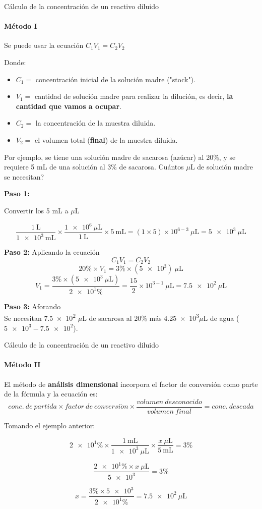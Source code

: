 \documentclass[12pt, aspectratio=169]{beamer}
\begin{document}
\begin{frame} {C\'alculo de la concentraci\'on de un reactivo diluido} %
	\framesubtitle{M\'etodo I}
	Se puede usar la ecuaci\'on $C_1V_1 = C_2V_2$
	
	Donde:
	\begin{itemize}
		\item $C_1 =$ concentraci\'on inicial de la soluci\'on madre ("stock").
		\item $V_1 =$ cantidad de soluci\'on madre para realizar la diluci\'on, es decir, \textbf{la cantidad que vamos a ocupar}.
		\item $C_2 =$ la concentraci\'on de la muestra diluida.
		\item $V_2 =$ el volumen total (\textbf{final}) de la muestra diluida.  
	\end{itemize}
	
	Por ejemplo, se tiene una soluci\'on madre de sacarosa (az\'ucar) al 20\%, y se requiere 5 mL de una soluci\'on al 3\% de sacarosa. \textquestiondown Cu\'antos $\mu$L de soluci\'on madre se necesitan?
	
	\textbf{Paso 1:}
	
	Convertir los 5 mL a $\mu$L
	
	$$\frac{1~ \text{L}}{\num{1e3} ~\text{mL}} \times \frac{\num{1e6}~\mu \text{L}}{1~ \text{L}} \times 5 ~\text{mL} = (1 \times 5) \times 10^{6-3} ~\mu \text{L} = \num{5e3} ~\mu \text{L} $$ 
	
	\textbf{Paso 2:}
	Aplicando la ecuaci\'on
	$$C_1V_1 = C_2V_2$$
	$$20\% \times V_1 = 3\% \times (\num{5e3})~\mu \text{L}$$	
	$$V_1 = \frac{3\% \times (\num{5e3}~\mu \text{L})}{\num{2e1}\%} = \frac{15}{2} \times 10^{3-1} ~\mu \text{L} = \num{7.5e2} ~\mu \text{L}$$
	
	\textbf{Paso 3:} 
	Aforando \\
	Se necesitan \num{7.5e2} $\mu \text{L}$ de sacarosa al 20\% m\'as \num{4.25e3}$\mu \text{L}$ de agua ($\num{5e3}-\num{7.5e2}$). 
		
\end{frame}

\begin{frame} {C\'alculo de la concentraci\'on de un reactivo diluido}
	\framesubtitle{M\'etodo II}
	El m\'etodo de \textbf{an\'alisis dimensional} incorpora el factor de conversi\'on como parte de la f\'ormula y la ecuaci\'on es:
	$$conc. ~ de~ partida \times factor ~de~ conversi\acute{o}n \times \frac{volumen ~desconocido}{volumen ~final} = conc. ~deseada$$
	
	Tomando el ejemplo anterior:
	
	$$\num{2e1}\% \times \frac{1 ~\text{mL}}{\num{1e3}~\mu \text{L}} \times \frac{x ~\mu \text{L}}{5 ~\text{mL}} = 3\%$$
	
	\vspace{2ex}
	
	$$\frac{\num{2e1}\% \times x~\mu \text{L}}{\num{5e3}} = 3\%$$
	
	$$x = \frac{3\% \times \num{5e3}}{\num{2e1}\%} = \num{7.5e2}~\mu \text{L}$$
	
\end{frame}
\end{document}
